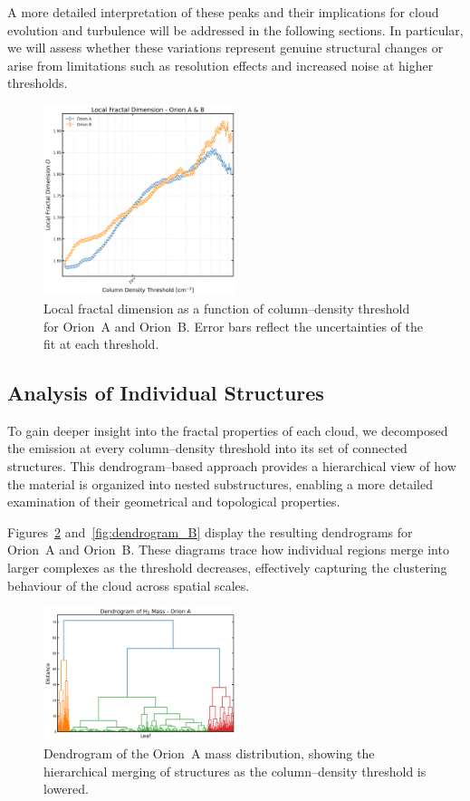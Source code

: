 A more detailed interpretation of these peaks and their implications for cloud evolution and turbulence will be addressed in the following sections. In particular, we will assess whether these variations represent genuine structural changes or arise from limitations such as resolution effects and increased noise at higher thresholds.

\begin{figure}[t]
    \centering
    \includegraphics[width=0.5\textwidth]{figures/local_orion_A_B.png}
    \caption{Local fractal dimension as a function of column--density threshold for Orion~A and Orion~B. Error bars reflect the uncertainties of the fit at each threshold.}
    \label{fig:local_Orion_A_B}
\end{figure}

\subsection{Analysis of Individual Structures}

To gain deeper insight into the fractal properties of each cloud, we decomposed the emission at every column--density threshold into its set of connected structures. This dendrogram--based approach provides a hierarchical view of how the material is organized into nested substructures, enabling a more detailed examination of their geometrical and topological properties.

Figures~\ref{fig:dendrogram_A} and~\ref{fig:dendrogram_B} display the resulting dendrograms for Orion~A and Orion~B. These diagrams trace how individual regions merge into larger complexes as the threshold decreases, effectively capturing the clustering behaviour of the cloud across spatial scales.

\begin{figure}[t]
    \centering
    \includegraphics[width=0.5\textwidth]{figures/dendogram_A.png}
    \caption{Dendrogram of the Orion~A mass distribution, showing the hierarchical merging of structures as the column--density threshold is lowered.}
    \label{fig:dendrogram_A}
\end{figure}

